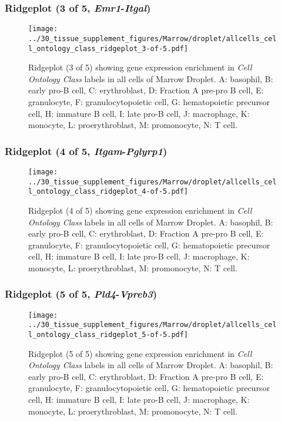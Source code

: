 \clearpage

\subsubsection{Ridgeplot (3 of 5, \emph{Emr1}-\emph{Itgal})}
\begin{figure}[h]
\centering
\texttt{[image: ../30\_tissue\_supplement\_figures/Marrow/droplet/allcells\_cell\_ontology\_class\_ridgeplot\_3-of-5.pdf]}

\caption{ Ridgeplot (3 of 5)  showing gene expression enrichment in \emph{Cell Ontology Class} labels in all cells of Marrow Droplet. A: basophil, B: early pro-B cell, C: erythroblast, D: Fraction A pre-pro B cell, E: granulocyte, F: granulocytopoietic cell, G: hematopoietic precursor cell, H: immature B cell, I: late pro-B cell, J: macrophage, K: monocyte, L: proerythroblast, M: promonocyte, N: T cell.}
\end{figure}


\clearpage

\subsubsection{Ridgeplot (4 of 5, \emph{Itgam}-\emph{Pglyrp1})}
\begin{figure}[h]
\centering
\texttt{[image: ../30\_tissue\_supplement\_figures/Marrow/droplet/allcells\_cell\_ontology\_class\_ridgeplot\_4-of-5.pdf]}

\caption{ Ridgeplot (4 of 5)  showing gene expression enrichment in \emph{Cell Ontology Class} labels in all cells of Marrow Droplet. A: basophil, B: early pro-B cell, C: erythroblast, D: Fraction A pre-pro B cell, E: granulocyte, F: granulocytopoietic cell, G: hematopoietic precursor cell, H: immature B cell, I: late pro-B cell, J: macrophage, K: monocyte, L: proerythroblast, M: promonocyte, N: T cell.}
\end{figure}


\clearpage

\subsubsection{Ridgeplot (5 of 5, \emph{Pld4}-\emph{Vpreb3})}
\begin{figure}[h]
\centering
\texttt{[image: ../30\_tissue\_supplement\_figures/Marrow/droplet/allcells\_cell\_ontology\_class\_ridgeplot\_5-of-5.pdf]}

\caption{ Ridgeplot (5 of 5)  showing gene expression enrichment in \emph{Cell Ontology Class} labels in all cells of Marrow Droplet. A: basophil, B: early pro-B cell, C: erythroblast, D: Fraction A pre-pro B cell, E: granulocyte, F: granulocytopoietic cell, G: hematopoietic precursor cell, H: immature B cell, I: late pro-B cell, J: macrophage, K: monocyte, L: proerythroblast, M: promonocyte, N: T cell.}
\end{figure}


